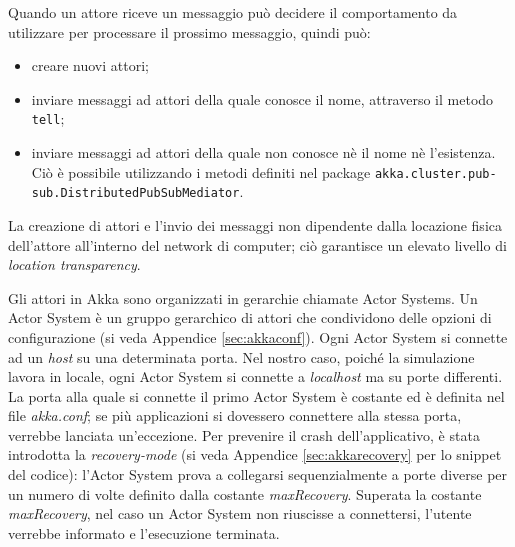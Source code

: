 Quando un attore riceve un messaggio può decidere il comportamento
da utilizzare per processare il prossimo messaggio, quindi può:
\begin{itemize}
	\item creare nuovi attori;
	\item inviare messaggi ad attori della quale conosce il nome, attraverso il metodo \texttt{tell};
	\item inviare messaggi ad attori della quale non conosce nè il nome nè l'esistenza.
	Ciò è possibile utilizzando i metodi definiti nel package \texttt{akka.cluster.pub- sub.DistributedPubSubMediator}.
\end{itemize}
La creazione di attori e l'invio dei messaggi non dipendente dalla
locazione fisica dell'attore all'interno del network di computer;
ciò garantisce un elevato livello di \emph{location transparency}.

Gli attori in Akka sono organizzati in gerarchie chiamate Actor Systems.
Un Actor System è un gruppo gerarchico di attori che condividono delle
opzioni di configurazione (si veda Appendice \ref{sec:akkaconf}). Ogni Actor System si connette ad un \emph{host} su una determinata porta. Nel nostro caso, poiché la simulazione lavora in locale, ogni Actor System si connette a \emph{localhost} ma su porte differenti. La porta alla quale si connette il primo Actor System è costante ed è definita nel file \emph{akka.conf}; se più applicazioni si dovessero connettere alla stessa porta, verrebbe lanciata un'eccezione. Per prevenire il crash dell'applicativo, è stata introdotta la \emph{recovery-mode} (si veda Appendice \ref{sec:akkarecovery} per lo snippet del codice): l'Actor System prova a collegarsi sequenzialmente a porte diverse per un numero di volte definito dalla costante \emph{maxRecovery}. Superata la costante \emph{maxRecovery}, nel caso un Actor System non riuscisse a connettersi, l'utente verrebbe informato e l'esecuzione terminata.\\


